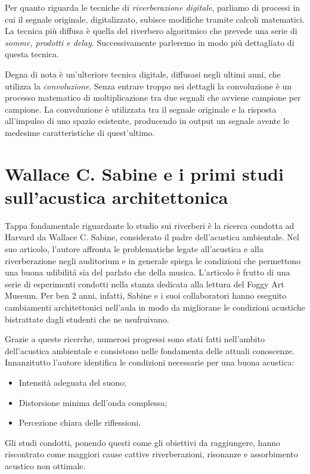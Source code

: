 Per quanto riguarda le tecniche di \emph{riverberazione digitale}, parliamo di processi in cui il segnale originale, digitalizzato, subisce modifiche tramite calcoli matematici. La tecnica più diffusa è quella del riverbero algoritmico che prevede una serie di \textit{somme, prodotti e delay}. Successivamente parleremo in modo più dettagliato di questa tecnica.

Degna di nota è un’ulteriore tecnica digitale, diffusasi negli ultimi anni, che utilizza la \emph{convoluzione}. Senza entrare troppo nei dettagli la convoluzione è un processo matematico di moltiplicazione tra due segnali che avviene campione per campione. La convoluzione è utilizzata tra il segnale originale e la risposta all’impulso di uno spazio esistente, producendo in output un segnale avente le medesime caratteristiche di quest’ultimo.

\section{Wallace C. Sabine e i primi studi sull'acustica architettonica}

Tappa fondamentale riguardante lo studio sui riverberi è la ricerca condotta ad Harvard da Wallace C. Sabine, considerato il padre dell’acustica ambientale.
Nel suo articolo, l’autore affronta le problematiche legate all’acustica e alla riverberazione negli auditorium e in generale spiega le condizioni che permettono una buona udibilitá sia del parlato che della musica.
L’articolo è frutto di una serie di esperimenti condotti nella stanza dedicata alla lettura del Foggy Art Museum. Per ben 2 anni, infatti, Sabine e i suoi collaboratori hanno eseguito cambiamenti architettonici nell’aula in modo da migliorane le condizioni acustiche bistrattate dagli studenti che ne usufruivano.

Grazie a queste ricerche, numerosi progressi sono stati fatti nell’ambito dell’acustica ambientale e consistono nelle fondamenta delle attuali conoscenze.
Innanzitutto l’autore identifica le condizioni necessarie per una buona acustica:
\begin{itemize}
\item Intensità adeguata del suono;
\item Distorsione minima dell’onda complessa;
\item Percezione chiara delle riflessioni.
\end{itemize}

Gli studi condotti, ponendo questi come gli obiettivi da raggiungere, hanno riscontrato come maggiori cause cattive riverberazioni, risonanze e assorbimento acustico non ottimale.

